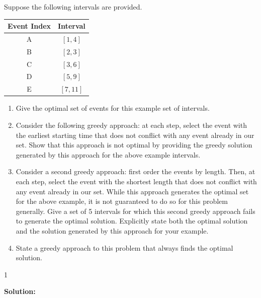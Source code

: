 \documentclass[9pt]{article}
\def\solutions{1}
\begin{document}
Suppose the following intervals are provided.

\begin{center}
\begin{tabular}{c|c}
Event Index & Interval \\ \hline
A & $[1, 4]$ \\ 
B & $[2, 3]$ \\
C & $[3, 6]$ \\
D & $[5, 9]$ \\
E & $[7, 11]$
\end{tabular}
\end{center}

\begin{enumerate}

\item Give the optimal set of events for this example set of intervals.

\item Consider the following greedy approach: at each step, select the event with the earliest starting time that does not conflict with any event already in our set. Show that this approach is not optimal by providing the greedy solution generated by this approach for the above example intervals.

\item Consider a second greedy approach: first order the events by length. Then, at each step, select the event with the shortest length that does not conflict with any event already in our set. While this approach generates the optimal set for the above example, it is not guaranteed to do so for this problem generally. Give a set of 5 intervals for which this second greedy approach fails to generate the optimal solution. Explicitly state both the optimal solution and the solution generated by this approach for your example.

\item State a greedy approach to this problem that always finds the optimal solution.

\end{enumerate}

\if\solutions1
\vspace{2mm}

\textbf{Solution:} \\
\end{document}
